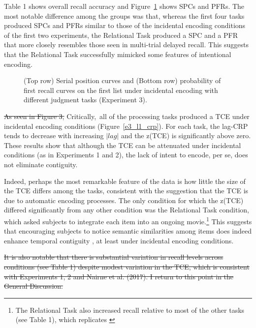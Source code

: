 \documentclass[man,natbib,floatsintext]{apa6} %
\begin{document}
\color{red}
Table 1 shows overall recall accuracy and Figure~\ref{e3_l1_spc} shows SPCs and PFRs. The most notable difference among the groups was that, whereas the first four tasks produced SPCs and PFRs similar to those of the incidental encoding conditions of the first two experiments, the Relational Task produced a SPC and a PFR that more closely resembles those seen in multi-trial delayed recall. This suggests that the Relational Task successfully mimicked some features of intentional encoding.

\begin{figure}
\caption{(Top row) Serial position curves and (Bottom row) probability of first recall curves on the first list under incidental encoding with different judgment tasks (Experiment 3).\spcpaneltext}
\label{e3_l1_spc}
\end{figure}

\color{black}

\st{As seen in Figure 3,}\color{red} Critically,\color{black}~all of the processing tasks produced a TCE under incidental encoding conditions \color{red}(Figure~\ref{e3_l1_crp})\color{black}. For each task, the lag-CRP tends to decrease with increasing $|lag|$ and the z(TCE) is significantly above zero. These results show that although the TCE can be attenuated under incidental conditions (as in Experiments 1 and 2), the lack of intent to encode, per se, does not eliminate contiguity.

Indeed, perhaps the most remarkable feature of the data is how little the size of the TCE differs among the tasks, consistent with the suggestion that the TCE is due to automatic encoding processes. The only condition for which the z(TCE) differed significantly from any other condition was the Relational Task condition, which asked subjects to integrate each item into an ongoing movie.\footnote{The Relational Task also increased recall relative to most of the other tasks (see Table 1), which replicates \citet{BowClar69}} This suggests that encouraging subjects to notice semantic similarities among items does indeed enhance temporal contiguity \citep{Hint16}, at least under incidental encoding conditions.

\st{It is also notable that there is substantial variation in recall levels across conditions (see Table 1) despite modest variation in the TCE, which is consistent with Experiments 1, 2 and Nairne et al. (2017). I return to this point in the General Discussion.}
\end{document}

